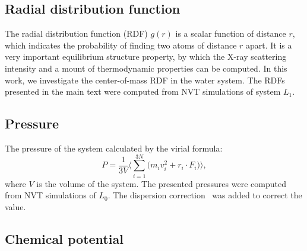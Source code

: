 \documentclass[a4paper,preprint,unsortedaddress,onecolumn,fleqn]{revtex4}
\begin{document}
\subsection{Radial distribution function}

The radial distribution function (RDF) $g(r)$ is a scalar function of
distance $r$, which indicates the probability of finding two atoms of
distance $r$ apart. It is a very important equilibrium structure property,
by which the X-ray scattering intensity and a mount of thermodynamic
properties can be computed. In this work, we investigate the center-of-mass
RDF in the water system. The RDFs presented in the main text were computed
from NVT simulations of system $L_1$.


\subsection{Pressure}

The pressure of the system calculated by the virial formula: 
\begin{equation*}
P=\frac{1}{3V}\Bigg\langle\sum_{i=1}^{3N}\Big(m_{i}\mathbf{\mathit{v}}%
_{i}^{2}+\mathbf{\mathit{r}}_{i}\cdot \mathbf{\mathit{F}}_{i}\Big)%
\Bigg\rangle,
\end{equation*}%
where $V$ is the volume of the system. The presented pressures were computed
from NVT simulations of $L_{0}$. The dispersion correction~\cite{frenkel2001understanding} was
added to correct the value.

\subsection{Chemical potential}
\end{document}
